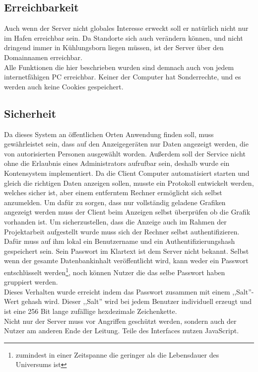 \subsection{Erreichbarkeit} %
Auch wenn der Server nicht globales Interesse erweckt soll er natürlich nicht nur im Hafen erreichbar sein.
Da Standorte sich auch verändern können,
und nicht dringend immer in Kühlungsborn liegen müssen, ist der Server über den Domainnamen  erreichbar. \\
Alle Funktionen die hier beschrieben wurden sind demnach auch von jedem internetfähigen PC erreichbar. Keiner der Computer hat Sonderrechte,
und es werden auch keine Cookies gespeichert.

\subsection{Sicherheit} %
Da dieses System an öffentlichen Orten Anwendung finden soll,
muss gewährleistet sein, dass auf den Anzeigegeräten nur Daten angezeigt werden,
die von autorisierten Personen ausgewählt worden.
Außerdem soll der Service nicht ohne die Erlaubnis eines Administrators aufrufbar sein,
deshalb wurde ein Kontensystem implementiert.
Da die Client Computer automatisiert starten und gleich die richtigen Daten anzeigen sollen,
musste ein Protokoll entwickelt werden, welches sicher ist,
aber einem entferntem Rechner ermöglicht sich selbst anzumelden.
Um dafür zu sorgen, dass nur vollständig geladene Grafiken angezeigt werden muss
der Client beim Anzeigen selbst überprüfen ob die Grafik vorhanden ist.
Um sicherzustellen, dass die Anzeige auch im Rahmen der Projektarbeit aufgestellt
wurde muss sich der Rechner selbst authentifizieren.
Dafür muss auf ihm lokal ein Benutzername und ein
Authentifizierungshash gespeichert sein. Sein Passwort im Klartext ist dem Server nicht bekannt.
Selbst wenn der gesamte Datenbankinhalt veröffentlicht wird, kann weder ein Passwort
entschlüsselt werden\footnote{zumindest in einer Zeitspanne die
geringer als die Lebensdauer des Universums ist}, noch können Nutzer die das selbe Passwort haben
gruppiert werden.\\
Dieses Verhalten wurde erreicht indem das Passwort zusammen mit einem ,,Salt''-Wert gehash wird.
Dieser ,,Salt'' wird bei jedem Benutzer individuell
erzeugt und ist eine 256 Bit lange zufällige hexdezimale Zeichenkette.\\
Nicht nur der Server muss vor Angriffen geschützt werden, sondern auch der
Nutzer am anderen Ende der Leitung.
Teile des Interfaces nutzen JavaScript.
